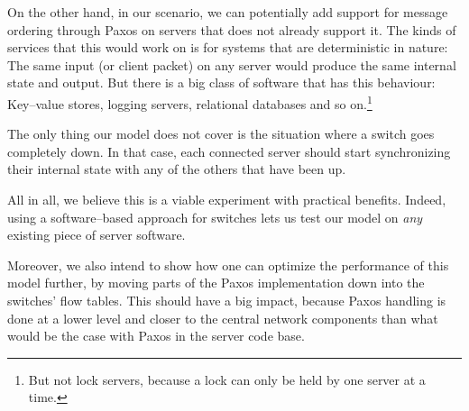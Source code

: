 On the other hand, in our scenario, we can potentially add support for
message ordering through Paxos on servers that does not already support it.
The kinds of services that this would work on is for systems that are
deterministic in nature: The same input (or client packet) on any server
would produce the same internal state and output.
%
But there is a big class of software that has this behaviour:  Key--value
stores, logging servers, relational databases and so on.\footnote{But not
lock servers, because a lock can only be held by one server at a time.}

The only thing our model does not cover is the situation where a switch goes
completely down.  In that case, each connected server should start
synchronizing their internal state with any of the others that have been up.

All in all, we believe this is a viable experiment with practical benefits.
Indeed, using a software--based approach for switches lets us test our model
on \textit{any} existing piece of server software.

Moreover, we also intend to show how one can optimize the performance of
this model further, by moving parts of the Paxos implementation down into
the switches' flow tables.  This should have a big impact, because Paxos
handling is done at a lower level and closer to the central network
components than what would be the case with Paxos in the server code base.

